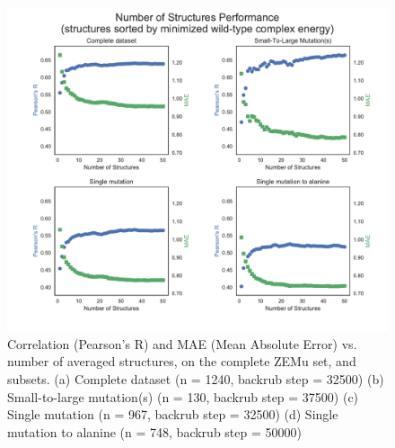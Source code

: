 \begin{figure}
  \includegraphics[width=\textwidth,keepaspectratio]{structs-v-corr-WildTypeComplex.pdf}
  \caption{
    Correlation (Pearson's R) and MAE (Mean Absolute Error) vs. number of averaged structures, on the complete ZEMu set, and subsets.
    (a) Complete dataset (n = 1240, backrub step = 32500)
    (b) Small-to-large mutation(s) (n = 130, backrub step = 37500)
    (c) Single mutation (n = 967, backrub step = 32500)
    (d) Single mutation to alanine (n = 748, backrub step = 50000)
  } \label{fig:structs-v-corr-WildTypeComplex}
\end{figure}

